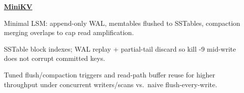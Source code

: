 \begin{twocolentry}{}
\href{https://github.com/faketut/MiniKV}{\textbf{MiniKV}}
\end{twocolentry}
\begin{onecolentry}
\begin{highlights}
\item Minimal LSM: append-only WAL, memtables flushed to SSTables, compaction merging overlaps to cap read amplification.
\item SSTable block indexes; WAL replay + partial-tail discard so kill -9 mid-write does not corrupt committed keys.
\item Tuned flush/compaction triggers and read-path buffer reuse for higher throughput under concurrent writers/scans vs.\ naive flush-every-write.
\end{highlights}
\end{onecolentry}
